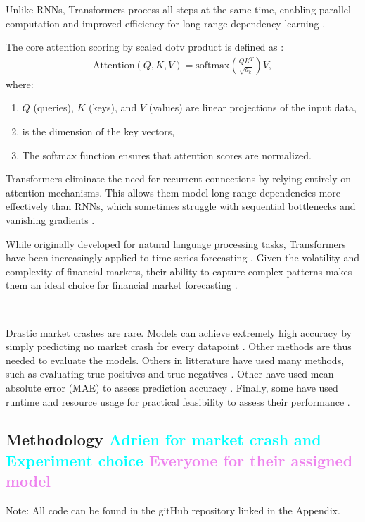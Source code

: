 \documentclass[12pt, letterpaper]{article}
\begin{document}
    Unlike RNNs, Transformers process all steps at the same time, enabling parallel computation and improved efficiency for long-range dependency learning \cite{vaswani2017attention}.

The core attention scoring by scaled dotv product is defined as \cite{vaswani2017attention}:
{\small \begin{align*} \text{Attention}(Q, K, V) = \text{softmax}\left(\frac{QK^T}{\sqrt{d_k}}\right)V, \end{align*} }
where:
\begin{enumerate}[label=-] \item $Q$ (queries), $K$ (keys), and $V$ (values) are linear projections of the input data,
\item  is the dimension of the key vectors,
\item The softmax function ensures that attention scores are normalized.
\end{enumerate}

Transformers eliminate the need for recurrent connections by relying entirely on attention mechanisms. This allows them model long-range dependencies more effectively than RNNs, which sometimes struggle with sequential bottlenecks and vanishing gradients \cite{vaswani2017attention}.

While originally developed for natural language processing tasks, Transformers have been increasingly applied to time-series forecasting \cite{zeng2023financial}.
Given the volatility and complexity of financial markets, their ability to capture complex patterns makes them an ideal choice for financial market forecasting \cite{wu2020deep}.

\

    Drastic market crashes are rare. Models can achieve extremely high accuracy by simply predicting no market crash for every datapoint \cite{market_infrequent}. Other methods are thus needed to evaluate the models. Others in litterature have used many methods, such as evaluating true positives and true negatives \cite{true_positive}. Other have used mean absolute error (MAE) to assess prediction accuracy \cite{hyndman2018}. Finally, some have used runtime and resource usage for practical feasibility to assess their performance \cite{lim2021temporal}.

\subsection*{Methodology \textcolor{cyan}{Adrien for market crash and Experiment choice} \textcolor{violet}{Everyone for their assigned model}}
Note: All code can be found in the gitHub repository linked in the Appendix.
\end{document}
